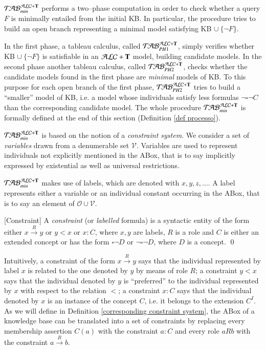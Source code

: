 \documentclass[a4paper, 11pt, oneside]{elsarticle}
\newcommand{\tip}{{\bf T}}
\newcommand{\alct}{\mathcal{ALC}+\tip}
\newcommand{\unione} {\cup}
\newcommand{\nott} {\lnot}
\newcommand{\bbox}{\square}
\newcommand{\nuovoc}{\mathrel{{\mathcal{T}\!\mathcal{AB}}}_{min}^{\mathcal{ALC}+\mbox{\scriptsize $\tip$}}}
\newcommand{\primo}{\mathrel{{\mathcal{T}\!\mathcal{AB}}}_{PH 1}^{\mathcal{ALC}+\mbox{\scriptsize $\tip$}}}
\newcommand{\secondo}{\mathrel{{\mathcal{T}\!\mathcal{AB}}}_{PH 2}^{\mathcal{ALC}+\mbox{\scriptsize $\tip$}}}
\newcommand{\trans}[1]{\stackrel{#1}{\longrightarrow}}
\newenvironment{definition}
{\begin{defi} \rm}{\qed \end{defi}}
\newcounter{posu}
\newtheorem{definition}[posu]{Definition}
\begin{document}
$\nuovoc$ performs a two--phase computation in order to check whether a query $F$ is minimally entailed from the initial KB.
In particular, the procedure tries to build an open branch representing a minimal model satisfying KB $\unione \ \{\nott F\}$.

\noindent In the first phase, a tableau calculus, called $\primo$, simply verifies whether KB $ \unione \ \{\nott F\}$ is satisfiable in an $\alct$ model, building candidate models.
In the second phase another tableau calculus, called $\secondo$, checks whether the candidate models found in the first phase are \emph{minimal} models of KB.
To this purpose for each open branch of the first phase, $\secondo$ tries to build a ``smaller'' model of KB, i.e. a model whose individuals satisfy less formulas $\nott \bbox \nott C$ than the corresponding candidate model.
The whole procedure $\nuovoc$ is formally defined at the end of this section (Definition \ref{def processo}).

$\nuovoc$ is based on the notion of a \emph{constraint system}.
We consider a set of \emph{variables} drawn from a denumerable set $\mathcal{V}$.
Variables are used to represent individuals not explicitly mentioned in the ABox, that is to say implicitly expressed by existential as well as universal restrictions.


$\nuovoc$ makes use of labels, which are denoted with $x, y, z, \dots$.
A label represents either a variable or an individual constant occurring in the ABox, that is to say an element of $\mathcal{O} \unione \mathcal{V}$.

\begin{definition}[Constraint]
A \emph{constraint} (or \emph{labelled} formula) is a syntactic entity of the form either $x \trans{R} y$ or $y<x$ or $x: C$, where $x, y$ are labels, $R$ is a role and $C$ is either an extended concept or has the form $\bbox \nott D$ or $\nott \bbox \nott D$, where $D$ is a concept.
\end{definition}

\noindent Intuitively, a constraint of the form $x \trans{R} y$ says that the individual represented by label $x$ is related to the one denoted by $y$ by means of role $R$; a constraint $y<x$ says that the individual denoted by $y$ is ``preferred'' to the individual represented by $x$ with respect to the relation $<$; a constraint $x: C$ says that the individual denoted by $x$ is an instance of the concept $C$, i.e. it belongs to the extension $C^I$.
As we will define in Definition \ref{corresponding constraint system}, the ABox of a knowledge base can be translated into a set of constraints by replacing every membership assertion $C(a)$ with the constraint $a: C$ and every role $a R b$ with the constraint $a \trans{R} b$.
\end{document}
